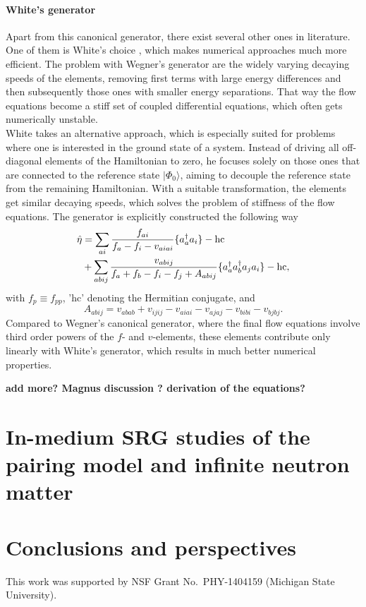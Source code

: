 \paragraph{White's generator}
Apart from this canonical generator, there exist several other ones in
literature. One of them is White's choice
\cite{White:2002fk}, which makes numerical approaches much
more efficient.  The problem with Wegner's generator are the widely
varying decaying speeds of the elements, removing first terms with
large energy differences and then subsequently those ones with smaller
energy separations.  That way the flow equations become a stiff set of
coupled differential equations, which often gets numerically
unstable.\\ White takes an alternative approach, which is especially
suited for problems where one is interested in the ground state of a
system. Instead of driving all off-diagonal elements of the
Hamiltonian to zero, he focuses solely on those ones that are
connected to the reference state $|\Phi_0\rangle$, aiming to decouple
the reference state from the remaining Hamiltonian. With a suitable
transformation, the elements get similar decaying speeds, which solves
the problem of stiffness of the flow equations.  The generator is
explicitly constructed the following way \cite{White:2002fk}
\begin{align}
\hat{\eta} &= \sum_{ai} \frac{f_{ai}}{f_a-f_i-v_{aiai}}\lbrace a_a^{\dagger}a_i\rbrace -\text{hc} \notag \\ & + \sum_{abij}
\frac{v_{abij}}{f_a+f_b-f_i-f_j+A_{abij}}\lbrace a_a^{\dagger}a_b^{\dagger}a_j
a_i\rbrace - \text{hc},
\label{eq:WhiteFull}
\end{align}
with $f_p \equiv f_{pp}$, 'hc' denoting the Hermitian conjugate, and
\[
A_{abij} = v_{abab} + v_{ijij} - v_{aiai} - v_{ajaj} - v_{bibi} -
v_{bjbj}.
\label{eq:White7}
\]
Compared to Wegner's canonical generator, where the final flow
equations involve third order powers of the $f$- and $v$-elements,
these elements contribute only linearly with White's generator, which
results in much better numerical properties.


{\bf add more? Magnus discussion ? derivation of the equations?}




\section{In-medium SRG studies of the pairing model and infinite neutron matter}

\section{Conclusions and perspectives}


\begin{acknowledgement}
This work was supported by NSF Grant No.~PHY-1404159 (Michigan State University).
\end{acknowledgement}


% 

    

